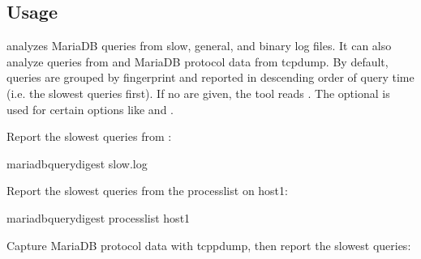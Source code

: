 \documentclass[letterpaper,10pt,english]{sphinxmanual}
\begin{document}
\subsection{Usage}
\label{\detokenize{mariadb-query-digest:usage}}
\begin{sphinxVerbatim}[commandchars=\\\{\}]
 \PYG{p}{[}\PYG{p}{]} \PYG{p}{[}\PYG{p}{]} \PYG{p}{[}\PYG{p}{]}
\end{sphinxVerbatim}

\sphinxAtStartPar
{} analyzes MariaDB queries from slow, general, and binary log
files.  It can also analyze queries from  and MariaDB
protocol data from tcpdump.  By default, queries are grouped by fingerprint
and reported in descending order of query time (i.e. the slowest queries
first).  If no  are given, the tool reads .  The optional
 is used for certain options like {\hyperref[\detokenize{mariadb-query-digest:cmdoption-mariadb-query-digest-since}]{}} and {\hyperref[\detokenize{mariadb-query-digest:cmdoption-mariadb-query-digest-until}]{}}.

\sphinxAtStartPar
Report the slowest queries from :

\begin{sphinxVerbatim}[commandchars=\\\{\}]
mariadb\PYGZhy{}query\PYGZhy{}digest slow.log
\end{sphinxVerbatim}

\sphinxAtStartPar
Report the slowest queries from the processlist on host1:

\begin{sphinxVerbatim}[commandchars=\\\{\}]
mariadb\PYGZhy{}query\PYGZhy{}digest \PYGZhy{}\PYGZhy{}processlist host1
\end{sphinxVerbatim}

\sphinxAtStartPar
Capture MariaDB protocol data with tcppdump, then report the slowest queries:
\end{document}
